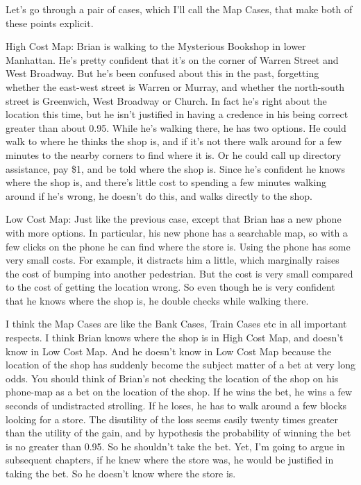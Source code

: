Let's go through a pair of cases, which I'll call the Map Cases, that make both of these points explicit.

\begin{description*}
\item[High Cost Map:] Brian is walking to the Mysterious Bookshop in lower Manhattan. He's pretty confident that it's on the corner of Warren Street and West Broadway. But he's been confused about this in the past, forgetting whether the east-west street is Warren or Murray, and whether the north-south street is Greenwich, West Broadway or Church. In fact he's right about the location this time, but he isn't justified in having a credence in his being correct greater than about 0.95. While he's walking there, he has two options. He could walk to where he thinks the shop is, and if it's not there walk around for a few minutes to the nearby corners to find where it is. Or he could call up directory assistance, pay \$1, and be told where the shop is. Since he's confident he knows where the shop is, and there's little cost to spending a few minutes walking around if he's wrong, he doesn't do this, and walks directly to the shop.
\item[Low Cost Map:] Just like the previous case, except that Brian has a new phone with more options. In particular, his new phone has a searchable map, so with a few clicks on the phone he can find where the store is. Using the phone has some very small costs. For example, it distracts him a little, which marginally raises the cost of bumping into another pedestrian. But the cost is very small compared to the cost of getting the location wrong. So even though he is very confident that he knows where the shop is, he double checks while walking there.
\end{description*}

\noindent I think the Map Cases are like the Bank Cases, Train Cases etc in all important respects. I think Brian knows where the shop is in High Cost Map, and doesn't know in Low Cost Map. And he doesn't know in Low Cost Map because the location of the shop has suddenly become the subject matter of a bet at very long odds. You should think of Brian's not checking the location of the shop on his phone-map as a bet on the location of the shop. If he wins the bet, he wins a few seconds of undistracted strolling. If he loses, he has to walk around a few blocks looking for a store. The disutility of the loss seems easily twenty times greater than the utility of the gain, and by hypothesis the probability of winning the bet is no greater than 0.95. So he shouldn't take the bet. Yet, I'm going to argue in subsequent chapters, if he knew where the store was, he would be justified in taking the bet. So he doesn't know where the store is.

